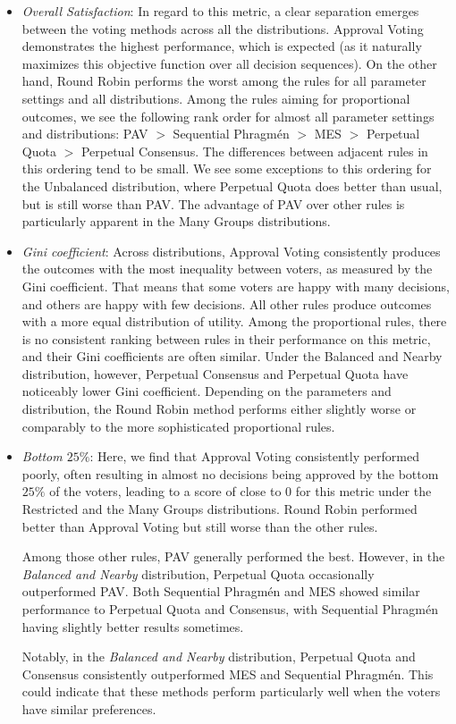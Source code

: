 \documentclass[10pt]{scrartcl}
\theoremstyle{plain}
\theoremstyle{definition}
\begin{document}
\begin{itemize}[leftmargin=15pt]
	\item \emph{Overall Satisfaction}: 
	In regard to this metric, a clear separation emerges between the voting methods across all the distributions. Approval Voting demonstrates the highest performance, which is expected (as it naturally maximizes this objective function over all decision sequences). On the other hand, Round Robin performs the worst among the rules for all parameter settings and all distributions. Among the rules aiming for proportional outcomes, we see the following rank order for almost all parameter settings and distributions: PAV $>$ Sequential Phragm\'en $>$ MES $>$ Perpetual Quota $>$ Perpetual Consensus. The differences between adjacent rules in this ordering tend to be small. We see some exceptions to this ordering for the Unbalanced distribution, where Perpetual Quota does better than usual, but is still worse than PAV. The advantage of PAV over other rules is particularly apparent in the Many Groups distributions.
	
	\item \emph{Gini coefficient}: 
	Across distributions, Approval Voting consistently produces the outcomes with the most inequality between voters, as measured by the Gini coefficient. That means that some voters are happy with many decisions, and others are happy with few decisions. All other rules produce outcomes with a more equal distribution of utility. Among the proportional rules, there is no consistent ranking between rules in their performance on this metric, and their Gini coefficients are often similar. Under the Balanced and Nearby distribution, however, Perpetual Consensus and Perpetual Quota have noticeably lower Gini coefficient. Depending on the parameters and distribution, the Round Robin method performs either slightly worse or comparably to the more sophisticated proportional rules.
	
	\item \emph{Bottom $25\%$}: 
	Here, we find that Approval Voting consistently performed poorly, often resulting in almost no decisions being approved by the bottom $25\%$ of the voters, leading to a score of close to 0 for this metric under the Restricted and the Many Groups distributions. Round Robin performed better than Approval Voting but still worse than the other rules.
	
	Among those other rules, PAV generally performed the best. However, in the \emph{Balanced and Nearby} distribution, Perpetual Quota occasionally outperformed PAV. Both Sequential Phragmén and MES showed similar performance to Perpetual Quota and Consensus, with Sequential Phragmén having slightly better results sometimes.
	
	Notably, in the \emph{Balanced and Nearby} distribution, Perpetual Quota and Consensus consistently outperformed MES and Sequential Phragmén. This could indicate that these methods perform particularly well when the voters have similar preferences.
\end{itemize}
\end{document}

